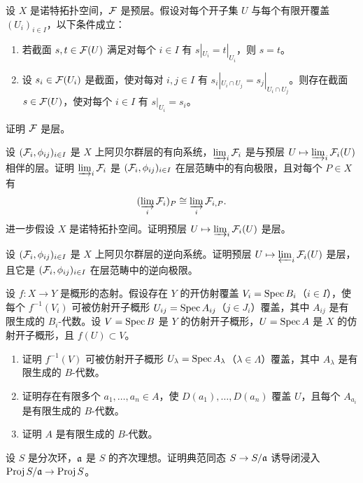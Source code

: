 \begin{exercises}
\item \label{ex:1.3.1} 设 $X$ 是诺特拓扑空间，$\mathcal{F}$ 是预层。假设对每个开子集 $U$ 与每个有限开覆盖 $(U_i)_{i\in I}$，以下条件成立：
\begin{enumerate}[label=(\roman*),leftmargin=2.8em]
  \item 若截面 $s,t\in \mathcal{F}(U)$ 满足对每个 $i\in I$ 有 $s|_{U_i}=t|_{U_i}$，则 $s=t$。
  \item 设 $s_i\in \mathcal{F}(U_i)$ 是截面，使对每对 $i,j\in I$ 有 $s_i|_{U_i\cap U_j}=s_j|_{U_i\cap U_j}$。则存在截面 $s\in \mathcal{F}(U)$，使对每个 $i\in I$ 有 $s|_{U_i}=s_i$。
\end{enumerate}
证明 $\mathcal{F}$ 是层。

\item \label{ex:1.3.2} 设 $(\mathcal{F}_i,\phi_{ij})_{i\in I}$ 是 $X$ 上阿贝尔群层的有向系统，$\varinjlim_i\mathcal{F}_i$ 是与预层 $U\mapsto \varinjlim_i\mathcal{F}_i(U)$ 相伴的层。证明 $\varinjlim_i\mathcal{F}_i$ 是 $(\mathcal{F}_i,\phi_{ij})_{i\in I}$ 在层范畴中的有向极限，且对每个 $P\in X$ 有
\[
(\varinjlim_i \mathcal{F}_i)_P\cong \varinjlim_i \mathcal{F}_{i,P}.
\]
进一步假设 $X$ 是诺特拓扑空间。证明预层 $U\mapsto \varinjlim_i\mathcal{F}_i(U)$ 是层。

\item \label{ex:1.3.3} 设 $(\mathcal{F}_i,\phi_{ij})_{i\in I}$ 是 $X$ 上阿贝尔群层的逆向系统。证明预层 $U\mapsto \varprojlim_i\mathcal{F}_i(U)$ 是层，且它是 $(\mathcal{F}_i,\phi_{ij})_{i\in I}$ 在层范畴中的逆向极限。

\item \label{ex:1.3.4} 设 $f\colon X\to Y$ 是概形的态射。假设存在 $Y$ 的开仿射覆盖 $V_i=\operatorname{Spec} B_i$（$i\in I$），使每个 $f^{-1}(V_i)$ 可被仿射开子概形 $U_{ij}=\operatorname{Spec} A_{ij}$（$j\in J_i$）覆盖，其中 $A_{ij}$ 是有限生成的 $B_i$-代数。设 $V=\operatorname{Spec} B$ 是 $Y$ 的仿射开子概形，$U=\operatorname{Spec} A$ 是 $X$ 的仿射开子概形，且 $f(U)\subset V$。
\begin{enumerate}[label=(\arabic*),leftmargin=2.4em]
  \item 证明 $f^{-1}(V)$ 可被仿射开子概形 $U_\lambda=\operatorname{Spec} A_\lambda$（$\lambda\in\Lambda$）覆盖，其中 $A_\lambda$ 是有限生成的 $B$-代数。
  \item 证明存在有限多个 $a_1,\dots,a_n\in A$，使 $D(a_1),\dots,D(a_n)$ 覆盖 $U$，且每个 $A_{a_i}$ 是有限生成的 $B$-代数。
  \item 证明 $A$ 是有限生成的 $B$-代数。
\end{enumerate}

\item \label{ex:1.3.5} 设 $S$ 是分次环，$\mathfrak{a}$ 是 $S$ 的齐次理想。证明典范同态 $S\to S/\mathfrak{a}$ 诱导闭浸入 $\operatorname{Proj} S/\mathfrak{a}\to \operatorname{Proj} S$。


\end{exercises}
